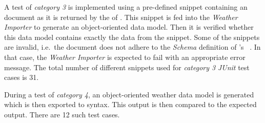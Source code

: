 A test of \emph{category 3} is implemented using a pre-defined snippet containing an  document as it is returned by the  of \yrno. This snippet is fed into the \emph{Weather Importer} to generate an object-oriented data model. Then it is verified whether this data model contains exactly the data from the snippet. Some of the snippets are invalid, i.e.\ the  document does not adhere to the  \emph{Schema} definition of \yrno's ~\cite{yrno_schema}.
In that case, the \emph{Weather Importer} is expected to fail with an appropriate error message. The total number of different snippets used for \emph{category 3} \emph{JUnit} test cases is \num{31}.

During a test of \emph{category 4}, an object-oriented weather data model is generated which is then exported to  syntax. This output is then compared to the expected output. There are \num{12} such test cases.
